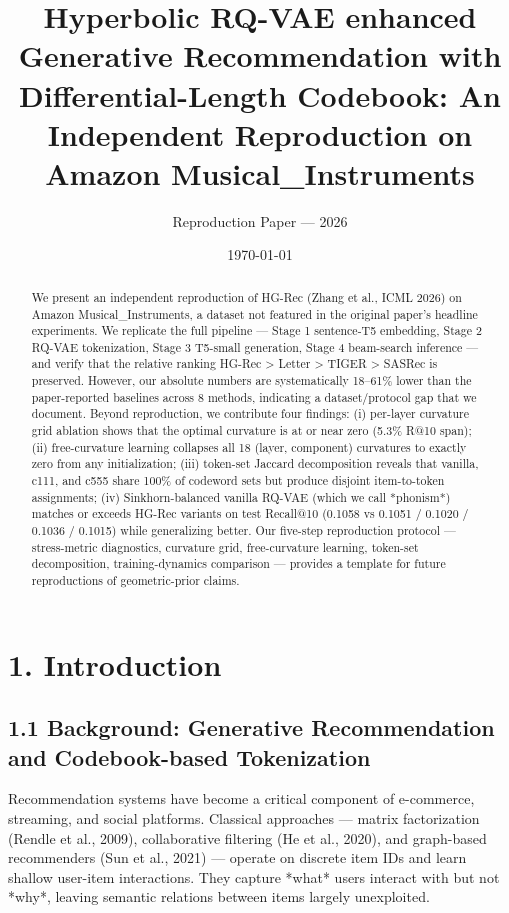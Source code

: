 \documentclass[11pt]{article}
\title{Hyperbolic RQ-VAE enhanced Generative Recommendation with Differential-Length Codebook: An Independent Reproduction on Amazon Musical\_Instruments}
\author{Reproduction Paper --- 2026}
\date{\today}
\begin{document}
\maketitle

\begin{abstract}
We present an independent reproduction of HG-Rec (Zhang et al., ICML 2026) on Amazon Musical\_Instruments, a dataset not featured in the original paper's headline experiments. We replicate the full pipeline — Stage 1 sentence-T5 embedding, Stage 2 RQ-VAE tokenization, Stage 3 T5-small generation, Stage 4 beam-search inference — and verify that the relative ranking HG-Rec > Letter > TIGER > SASRec is preserved. However, our absolute numbers are systematically 18–61\% lower than the paper-reported baselines across 8 methods, indicating a dataset/protocol gap that we document. Beyond reproduction, we contribute four findings: (i) per-layer curvature grid ablation shows that the optimal curvature is at or near zero (5.3\% R@10 span); (ii) free-curvature learning collapses all 18 (layer, component) curvatures to exactly zero from any initialization; (iii) token-set Jaccard decomposition reveals that vanilla, c111, and c555 share 100\% of codeword sets but produce disjoint item-to-token assignments; (iv) Sinkhorn-balanced vanilla RQ-VAE (which we call *phonism*) matches or exceeds HG-Rec variants on test Recall@10 (0.1058 vs 0.1051 / 0.1020 / 0.1036 / 0.1015) while generalizing better. Our five-step reproduction protocol — stress-metric diagnostics, curvature grid, free-curvature learning, token-set decomposition, training-dynamics comparison — provides a template for future reproductions of geometric-prior claims.
\end{abstract}


\section{1. Introduction}


\subsection{1.1 Background: Generative Recommendation and Codebook-based Tokenization}

Recommendation systems have become a critical component of e-commerce, streaming, and social platforms. Classical approaches — matrix factorization (Rendle et al., 2009), collaborative filtering (He et al., 2020), and graph-based recommenders (Sun et al., 2021) — operate on discrete item IDs and learn shallow user-item interactions. They capture *what* users interact with but not *why*, leaving semantic relations between items largely unexploited.
\end{document}
